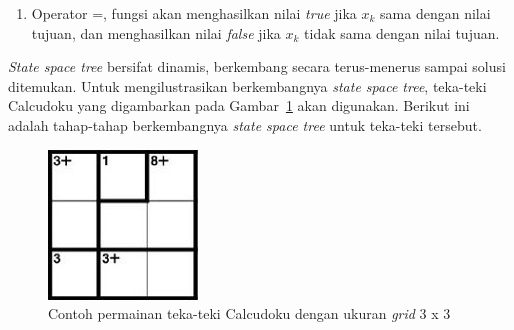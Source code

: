 \begin{enumerate}
\item Operator =, fungsi akan menghasilkan nilai \textit{true} jika \begin{math}x_k\end{math} sama dengan nilai tujuan, dan menghasilkan nilai \textit{false} jika \begin{math}x_k\end{math} tidak sama dengan nilai tujuan.
\end{enumerate}

\textit{State space tree} bersifat dinamis, berkembang secara terus-menerus sampai solusi ditemukan. Untuk mengilustrasikan berkembangnya \textit{state space tree}, teka-teki Calcudoku yang digambarkan pada Gambar~\ref{fig:backtracking4} akan digunakan. Berikut ini adalah tahap-tahap berkembangnya \textit{state space tree} untuk teka-teki tersebut.

\begin{figure}
\centering
\captionsetup{justification=centering}
\includegraphics[scale=1]{Gambar/Backtracking4}
\caption[Contoh permainan teka-teki Calcudoku dengan ukuran \textit{grid} 3 x 3 ~\cite{fahda:16:backtracking}]{Contoh permainan teka-teki Calcudoku dengan ukuran \textit{grid} 3 x 3  ~\cite{fahda:16:backtracking}}
\label{fig:backtracking4}
\end{figure}

